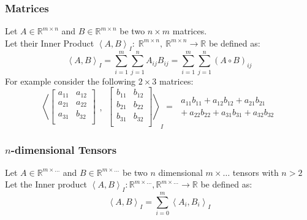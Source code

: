 \documentclass[12pt]{article}
\begin{document}
\subsubsection{Matrices}
Let \(A\in \mathbb{R}^{m \times n}\) and \(B\in \mathbb{R}^{m \times n}\) be two \(n \times m\) matrices. \\Let their Inner Product \(\left<A, B\right>_I:\; \mathbb{R}^{m \times n},~\mathbb{R}^{m \times n} \to \mathbb{R}\) be defined as:
\begin{equation} \label{eq:defs:Inner_product}
\left<A, B\right>_I = \sum_{i=1}^{m}\sum_{j=1}^{n} A_{ij}B_{ij} = \sum_{i=1}^{m}\sum_{j=1}^{n} (A \circ B)_{ij}
\end{equation}
For example consider the following \(2 \times 3\) matrices:
\[
\left<
\begin{bmatrix}
a_{11} & a_{12} \\
a_{21} & a_{22} \\
a_{31} & b_{32} \\
\end{bmatrix}
\begin{matrix} \\\\,\end{matrix}~
\begin{bmatrix}
b_{11} & b_{12} \\
b_{21} & b_{22} \\
b_{31} & b_{32} \\
\end{bmatrix}\right>_I
= \;
\begin{array}{ll}
     a_{11}b_{11} + a_{12}b_{12} + a_{21}b_{21}\\
+~a_{22}b_{22} + a_{31}b_{31} + a_{32}b_{32} 
\end{array}
\]

\subsubsection{\(n\)-dimensional Tensors}
Let \(A \in \mathbb{R}^{m \times \dots}\) and \(B \in \mathbb{R}^{m \times \dots}\) be two \(n\) dimensional \(m \times \dots\) tensors with \(n > 2\)\\
Let the Inner product \(\left<A, B\right>_I : \mathbb{R}^{m \times \dots}, \mathbb{R}^{m \times \dots} \to \mathbb{R}\) be defined as:
\begin{equation}\label{eq:defs:Inner_product_3d}
\left<A, B\right>_I = \sum_{i=0}^{m} \left<A_{i}, B_{i}\right>_I
\end{equation}
\end{document}
